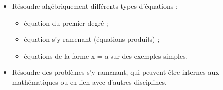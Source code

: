 \begin{prerequis}[Objectifs de 3\up{e}]  
    \begin{itemize}  
        \item Résoudre algébriquement différents types d’équations :
        \begin{itemize}
            \item équation du premier degré ;
            \item équation s’y ramenant (équations produits) ;
            \item équations de la forme x = a sur des exemples simples.
        \end{itemize}
        \columnbreak
        \item Résoudre des problèmes s’y ramenant, qui peuvent être internes aux mathématiques ou en lien
        avec d’autres disciplines.
    \end{itemize}
\end{prerequis}